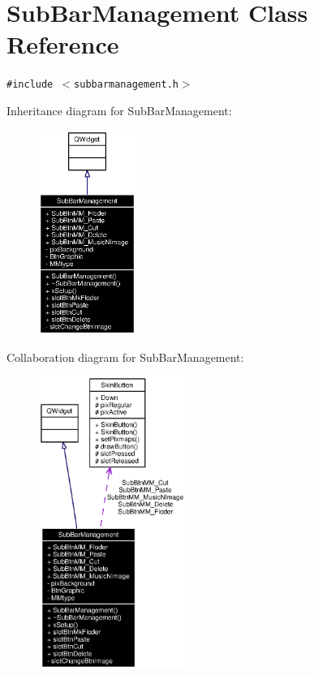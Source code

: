 \section{Sub\-Bar\-Management Class Reference}
\label{classSubBarManagement}
{\tt \#include $<$subbarmanagement.h$>$}

Inheritance diagram for Sub\-Bar\-Management:\begin{figure}[H]
\begin{center}
\leavevmode
\includegraphics[width=89pt]{classSubBarManagement__inherit__graph}
\end{center}
\end{figure}
Collaboration diagram for Sub\-Bar\-Management:\begin{figure}[H]
\begin{center}
\leavevmode
\includegraphics[width=135pt]{classSubBarManagement__coll__graph}
\end{center}
\end{figure}


